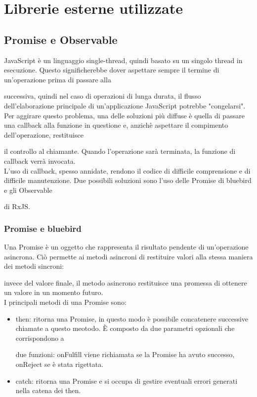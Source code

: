 	\section{Librerie esterne utilizzate}
	\subsection{Promise e Observable}


JavaScript è un linguaggio single-thread, quindi basato su un singolo thread in esecuzione. Questo significherebbe dover aspettare sempre il termine di un'operazione prima di passare alla

successiva, quindi nel caso di operazioni di lunga durata, il flusso dell'elaborazione principale di un’applicazione JavaScript potrebbe "congelarsi". \\


Per aggirare questo problema, una delle soluzioni più diffuse è quella di passare una callback alla funzione in questione e, anzichè aspettare il compimento dell'operazione, restituisce

il controllo al chiamante. Quando l'operazione sarà terminata, la funzione di callback verrà invocata. \\


L'uso di callback, spesso annidate, rendono il codice di difficile comprensione e di difficile manutenzione. Due possibili soluzioni sono l'uso delle Promise di bluebird e gli Observable

di RxJS.


\subsubsection{Promise e bluebird}


Una Promise è un oggetto che rappresenta il risultato pendente di un’operazione asincrona. Ciò permette ai metodi asincroni di restituire valori alla stessa maniera dei metodi sincroni:

invece del valore finale, il metodo asincrono restituisce una promessa di ottenere un valore in un momento futuro. \\

I principali metodi di una Promise sono:

\begin{itemize}

\item then: ritorna una Promise, in questo modo è possibile concatenere successive chiamate a questo meotodo. È composto da due parametri opzionali che corrispondono a 

due funzioni: onFulfill viene richiamata se la Promise ha avuto successo, onReject se è stata rigettata.  

\item catch: ritorna una Promise e si occupa di gestire eventuali errori generati nella catena dei then.

\end{itemize}


